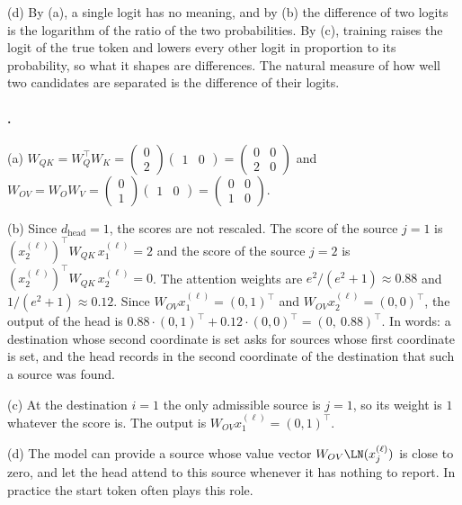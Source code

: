 {(d) By (a), a single logit has no meaning, and by (b) the difference of two logits is the logarithm of the ratio
of the two probabilities. By (c), training raises the logit of the true token and lowers every other logit in
proportion to its probability, so what it shapes are differences. The natural measure of how well two candidates
are separated is the difference of their logits.

\paragraph{.}
(a) $W_{QK}=W_Q^\top W_K=\begin{pmatrix}0\\2\end{pmatrix}\begin{pmatrix}1&0\end{pmatrix}=\begin{pmatrix}0&0\\2&0\end{pmatrix}$ and
$W_{OV}=W_OW_V=\begin{pmatrix}0\\1\end{pmatrix}\begin{pmatrix}1&0\end{pmatrix}=\begin{pmatrix}0&0\\1&0\end{pmatrix}$.

(b) Since $d_{\mathrm{head}}=1$, the scores are not rescaled. The score of the source $j=1$ is
$(x_2^{(\ell)})^\top W_{QK}\,x_1^{(\ell)}=2$ and the score of the source $j=2$ is
$(x_2^{(\ell)})^\top W_{QK}\,x_2^{(\ell)}=0$. The attention weights are $e^2/(e^2+1)\approx0.88$ and
$1/(e^2+1)\approx0.12$. Since $W_{OV}x_1^{(\ell)}=(0,1)^\top$ and $W_{OV}x_2^{(\ell)}=(0,0)^\top$, the output of the
head is $0.88\cdot(0,1)^\top+0.12\cdot(0,0)^\top=(0,\ 0.88)^\top$. In words: a destination whose second coordinate
is set asks for sources whose first coordinate is set, and the head records in the second coordinate of the
destination that such a source was found.

(c) At the destination $i=1$ the only admissible source is $j=1$, so its weight is $1$ whatever the score is.
The output is $W_{OV}x_1^{(\ell)}=(0,1)^\top$.

(d) The model can provide a source whose value vector $W_{OV}\LN(x_j^{(\ell)})$ is close to zero, and let the head
attend to this source whenever it has nothing to report. In practice the start token often plays this role.

}
